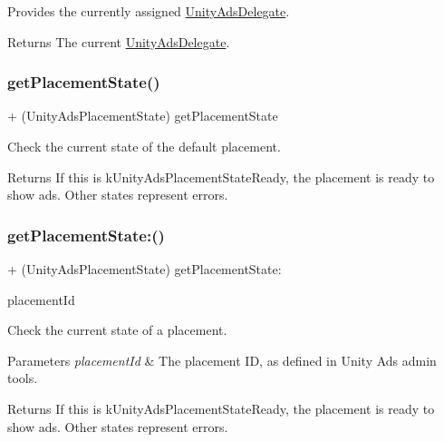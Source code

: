 Provides the currently assigned {\ttfamily \mbox{\hyperlink{protocol_unity_ads_delegate-p}{Unity\+Ads\+Delegate}}}.

\begin{DoxyReturn}{Returns}
The current {\ttfamily \mbox{\hyperlink{protocol_unity_ads_delegate-p}{Unity\+Ads\+Delegate}}}. 
\end{DoxyReturn}
\mbox{\label{interface_unity_ads_ae6cb2c812b3ecb379d4ece62e6d22b34}} 
\subsubsection{\texorpdfstring{getPlacementState()}{getPlacementState()}}
{\footnotesize\ttfamily + (Unity\+Ads\+Placement\+State) get\+Placement\+State \begin{DoxyParamCaption}{ }\end{DoxyParamCaption}}

Check the current state of the default placement.

\begin{DoxyReturn}{Returns}
If this is {\ttfamily k\+Unity\+Ads\+Placement\+State\+Ready}, the placement is ready to show ads. Other states represent errors. 
\end{DoxyReturn}
\mbox{\label{interface_unity_ads_abcd2309e4f159ca5f6c8bc55e1d13e78}} 
\subsubsection{\texorpdfstring{getPlacementState:()}{getPlacementState:()}}
{\footnotesize\ttfamily + (Unity\+Ads\+Placement\+State) get\+Placement\+State\+: \begin{DoxyParamCaption}\item[{(N\+S\+String $\ast$)}]{placement\+Id }\end{DoxyParamCaption}}

Check the current state of a placement.


\begin{DoxyParams}{Parameters}
{\em placement\+Id} & The placement ID, as defined in Unity Ads admin tools.\\
\hline
\end{DoxyParams}
\begin{DoxyReturn}{Returns}
If this is {\ttfamily k\+Unity\+Ads\+Placement\+State\+Ready}, the placement is ready to show ads. Other states represent errors. 
\end{DoxyReturn}
\mbox{\label{interface_unity_ads_adfc15977cddb12f40d465060e23f79f4}} 
